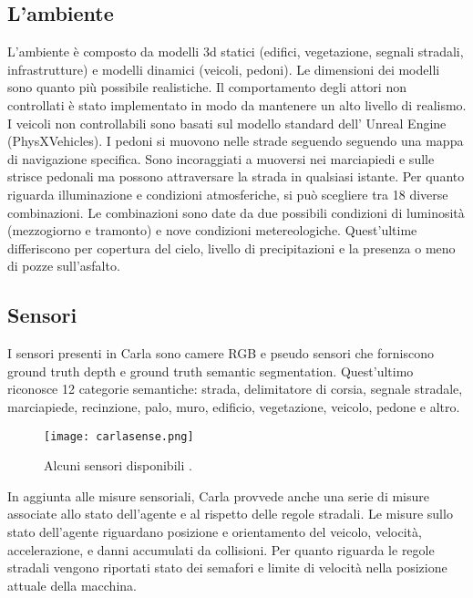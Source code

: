 \subsection{L'ambiente}
L'ambiente è composto da modelli 3d statici (edifici, vegetazione, segnali stradali, infrastrutture) e modelli dinamici (veicoli, pedoni). Le dimensioni 
dei modelli sono quanto più possibile realistiche.  Il comportamento degli attori non controllati è stato implementato in modo da mantenere un alto livello di realismo. I veicoli non controllabili
sono basati sul modello standard dell' Unreal Engine (PhysXVehicles). I pedoni si muovono nelle strade seguendo seguendo una mappa di navigazione specifica. Sono incoraggiati a muoversi nei 
marciapiedi e sulle strisce pedonali ma possono attraversare la strada in qualsiasi istante. Per quanto riguarda illuminazione e condizioni atmosferiche, si può scegliere tra 18 diverse combinazioni.
Le combinazioni sono date da due possibili condizioni di luminosità (mezzogiorno e tramonto) e nove condizioni metereologiche. Quest'ultime differiscono per copertura del cielo,
livello di precipitazioni e la presenza o meno di pozze sull'asfalto.
\subsection{Sensori}
I sensori presenti in Carla sono camere RGB e pseudo sensori che forniscono ground truth depth e ground truth semantic segmentation.
Quest'ultimo riconosce 12 categorie semantiche: strada, delimitatore di corsia, segnale stradale, marciapiede, recinzione, palo, muro, edificio, vegetazione,
veicolo, pedone e altro.
\begin{figure}[h]
    \texttt{[image: carlasense.png]}
    \caption{Alcuni sensori disponibili \cite{carla}.}
    \label{fig:sense}
\end{figure}
In aggiunta alle misure sensoriali, Carla provvede anche una serie di misure associate allo stato dell'agente e al rispetto delle regole stradali. Le misure 
sullo stato dell'agente riguardano posizione e orientamento del veicolo, velocità, accelerazione, e danni accumulati da collisioni. Per quanto riguarda le regole
stradali vengono riportati stato dei semafori e limite di velocità nella posizione attuale della macchina.
